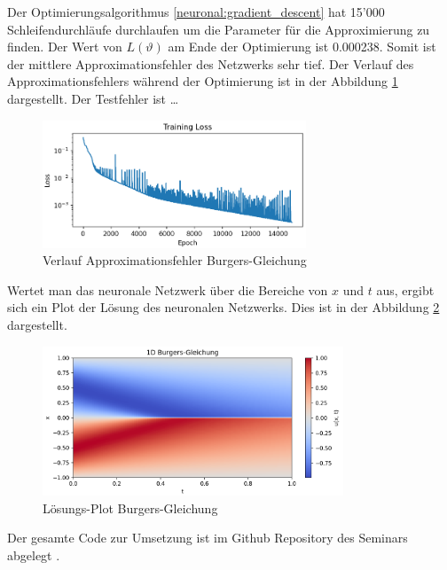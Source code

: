 Der Optimierungsalgorithmus \ref{neuronal:gradient_descent} hat 15'000 Schleifendurchläufe durchlaufen um die Parameter für die Approximierung zu finden.
Der Wert von $L(\vartheta)$ am Ende der Optimierung ist 0.000238.
Somit ist der mittlere Approximationsfehler des Netzwerks sehr tief.
Der Verlauf des Approximationsfehlers während der Optimierung ist in der Abbildung \ref{fig:fehler_burgers} dargestellt.
Der Testfehler ist \ldots

\begin{figure}
    \centering
    \hspace*{-0.1\textwidth}
    \includegraphics[width=0.7\textwidth]{papers/neuronal/images/train_error_burgers_net.png}
    \caption{Verlauf Approximationsfehler Burgers-Gleichung}
    \label{fig:fehler_burgers}
\end{figure}

Wertet man das neuronale Netzwerk über die Bereiche von $x$ und $t$ aus, ergibt sich ein Plot der Lösung des neuronalen Netzwerks.
Dies ist in der Abbildung \ref{fig:loesung_burgers} dargestellt.

\begin{figure}
    \centering
    \includegraphics[width=0.8\textwidth]{papers/neuronal/images/prediction_burgers_net.png}
    \caption{Lösungs-Plot Burgers-Gleichung}
    \label{fig:loesung_burgers}
\end{figure}

Der gesamte Code zur Umsetzung ist im Github Repository des Seminars abgelegt \cite{neuronal:github_source_code}.
